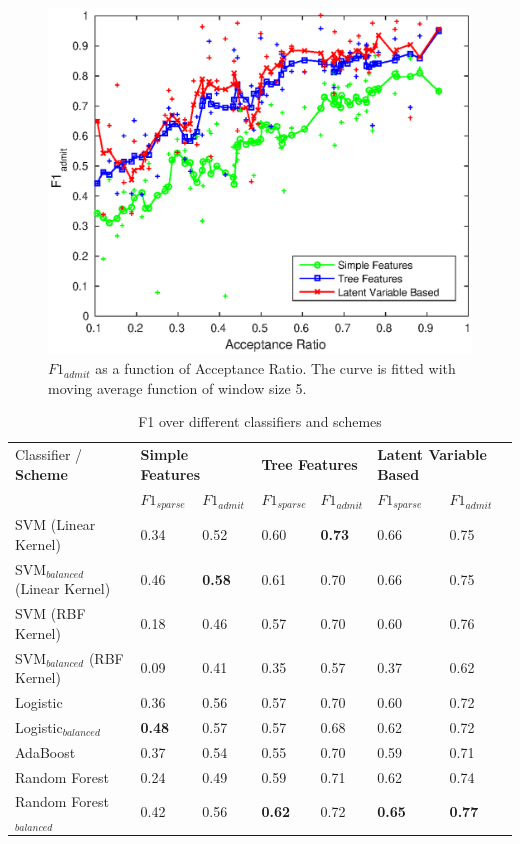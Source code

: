\documentclass{sig-alternate-05-2015}
\begin{document}
\begin{figure}[h]
\centering
\includegraphics[scale=0.6]{acceptance_ratio_vs_simple_tree_em.eps}
\caption{$F1_{admit}$ as a function of Acceptance Ratio.
The curve is fitted with moving average function of window size 5.}
\label{fig:acceptance_simple_tree_em}
\end{figure}


\begin{table}[t]
\centering
\caption{F1 over different classifiers and schemes}
\label{tab:all-f1}
\begin{tabular}{|l|l l|l l|l l|}
\hline
Classifier / \textbf{Scheme} & \multicolumn{2}{l|}{\textbf{Simple Features}} & \multicolumn{2}{l|}{\textbf{Tree Features}} & \multicolumn{2}{l|}{\textbf{Latent Variable Based}} \\
 & $F1_{sparse}$ & $F1_{admit}$ & $F1_{sparse}$ & $F1_{admit}$ & $F1_{sparse}$ & $F1_{admit}$ \\ \hline
SVM (Linear Kernel) 				& 0.34 & 0.52 & 0.60 & \textbf{0.73} & 0.66 & 0.75 \\
SVM$_{balanced}$ (Linear Kernel)	& 0.46 & \textbf{0.58} & 0.61 & 0.70 & 0.66 & 0.75 \\ \hline
SVM (RBF Kernel) 					& 0.18 & 0.46 & 0.57 & 0.70 & 0.60 & 0.76 \\
SVM$_{balanced}$ (RBF Kernel) 		& 0.09 & 0.41 & 0.35 & 0.57 & 0.37 & 0.62 \\ \hline
Logistic 							& 0.36 & 0.56 & 0.57 & 0.70 & 0.60 & 0.72 \\
Logistic$_{balanced}$ 				& \textbf{0.48} & 0.57 & 0.57 & 0.68 & 0.62 & 0.72 \\ \hline
AdaBoost 							& 0.37 & 0.54 & 0.55 & 0.70 & 0.59 & 0.71 \\ \hline
Random Forest 						& 0.24 & 0.49 & 0.59 & 0.71 & 0.62 & 0.74 \\
Random Forest$_{balanced}$ 			& 0.42 & 0.56 & \textbf{0.62} & 0.72 & \textbf{0.65} & \textbf{0.77} \\ \hline
\end{tabular}
\end{table}
\end{document}
